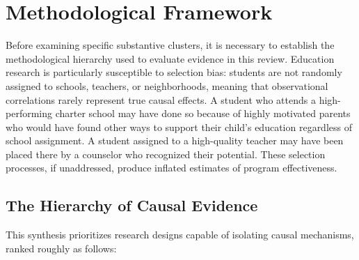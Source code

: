 \documentclass[12pt,letterpaper]{article}
\begin{document}
\section{Methodological Framework}

Before examining specific substantive clusters, it is necessary to establish the methodological hierarchy used to evaluate evidence in this review. Education research is particularly susceptible to selection bias: students are not randomly assigned to schools, teachers, or neighborhoods, meaning that observational correlations rarely represent true causal effects. A student who attends a high-performing charter school may have done so because of highly motivated parents who would have found other ways to support their child's education regardless of school assignment. A student assigned to a high-quality teacher may have been placed there by a counselor who recognized their potential. These selection processes, if unaddressed, produce inflated estimates of program effectiveness.

\subsection{The Hierarchy of Causal Evidence}

This synthesis prioritizes research designs capable of isolating causal mechanisms, ranked roughly as follows:
\end{document}
